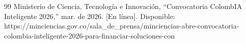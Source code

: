 \documentclass[letterpaper, 10 pt, conference]{ieeeconf}
\begin{document}
\begin{thebibliography}{99}
 Ministerio de Ciencia, Tecnología e Innovación, “Convocatoria ColombIA Inteligente 2026,” mar. de 2026. [En línea]. Disponible: https://minciencias.gov.co/sala\_de\_prensa/minciencias-abre-convocatoria-colombia-inteligente-2026-para-financiar-soluciones-con












\end{thebibliography}
\end{document}
